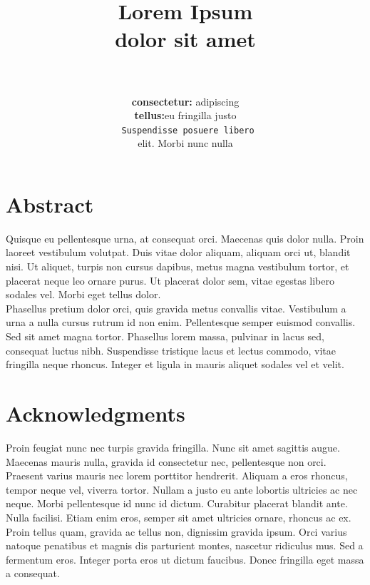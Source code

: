 \documentclass[paper=a4,dissertation,math,vertlayout,pdfa,colorlinks,nologo]{aaltoseries}
\title{     
    \textbf{
        \hspace{-12ex}Lorem Ipsum
        \\ \hspace{-12ex}dolor sit amet
    }
    \\[2.5ex]
    \textit{\hspace{-12ex}\\ \hspace{-11ex}}
}
\author{
    \hspace{-18ex} \textbf{consectetur:}  adipiscing \\[2.5ex]
    \hspace{-18ex} \textbf{tellus:}eu fringilla justo\\[2.5ex]
    \hspace{-18ex} \texttt{ Suspendisse posuere libero} \\[2.5ex]
    \hspace{-18ex} \normalsize{elit. Morbi nunc nulla}
}
\date{}
\newcommand\tab[1][1cm]{\hspace*{#1}}
\begin{document}
\maketitle
\chapter*{Abstract}
\tab  Quisque eu pellentesque urna, at consequat orci. Maecenas quis dolor nulla. Proin laoreet vestibulum volutpat. Duis vitae dolor aliquam, aliquam orci ut, blandit nisi. Ut aliquet, turpis non cursus dapibus, metus magna vestibulum tortor, et placerat neque leo ornare purus. Ut placerat dolor sem, vitae egestas libero sodales vel. Morbi eget tellus dolor.
\\ \tab Phasellus pretium dolor orci, quis gravida metus convallis vitae. Vestibulum a urna a nulla cursus rutrum id non enim. Pellentesque semper euismod convallis. Sed sit amet magna tortor. Phasellus lorem massa, pulvinar in lacus sed, consequat luctus nibh. Suspendisse tristique lacus et lectus commodo, vitae fringilla neque rhoncus. Integer et ligula in mauris aliquet sodales vel et velit. 
\newpage
\chapter*{Acknowledgments}
Proin feugiat nunc nec turpis gravida fringilla. Nunc sit amet sagittis augue. Maecenas mauris nulla, gravida id consectetur nec, pellentesque non orci. Praesent varius mauris nec lorem porttitor hendrerit. Aliquam a eros rhoncus, tempor neque vel, viverra tortor. Nullam a justo eu ante lobortis ultricies ac nec neque. Morbi pellentesque id nunc id dictum. Curabitur placerat blandit ante. Nulla facilisi. Etiam enim eros, semper sit amet ultricies ornare, rhoncus ac ex. Proin tellus quam, gravida ac tellus non, dignissim gravida ipsum. Orci varius natoque penatibus et magnis dis parturient montes, nascetur ridiculus mus. Sed a fermentum eros. Integer porta eros ut dictum faucibus. Donec fringilla eget massa a consequat. 
{
    \hypersetup{linkcolor=black}
    \tableofcontents
}

\end{document}
